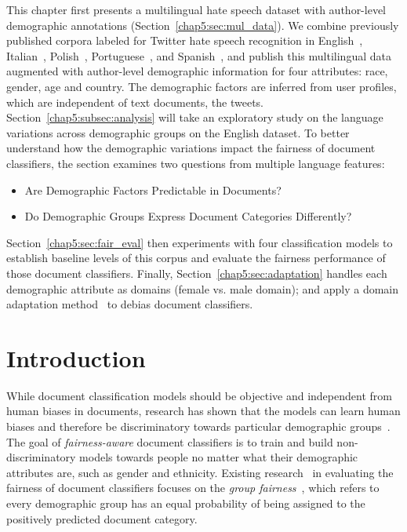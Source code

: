 This chapter first presents a multilingual hate speech dataset with author-level demographic annotations (Section~\ref{chap5:sec:mul_data}). 
We combine previously published corpora labeled for Twitter hate speech recognition in English~\cite{waseem2016hateful,waseem2016you,founta2018large}, Italian~\cite{sanguinetti2018italian}, Polish~\cite{ptaszynski2017learning}, Portuguese~\cite{fortuna2019hierarchically}, and Spanish~\cite{basile2019semeval}, and publish this multilingual data augmented with author-level demographic information for four attributes: race, gender, age and country.
The demographic factors are inferred from user profiles, which are independent of text documents, the tweets.
Section~\ref{chap5:subsec:analysis} will take an exploratory study on the language variations across demographic groups on the English dataset.
To better understand how the demographic variations impact the fairness of document classifiers, the section examines two questions from multiple language features:
\begin{itemize}
    \item Are Demographic Factors Predictable in Documents?
    \item Do Demographic Groups Express Document Categories Differently?
\end{itemize}
Section~\ref{chap5:sec:fair_eval} then experiments with four classification models to establish baseline levels of this corpus and evaluate the fairness performance of those document classifiers.
Finally, Section~\ref{chap5:sec:adaptation} handles each demographic attribute as domains (female vs. male domain); and apply a domain adaptation method~\cite{daume2007frustratingly} to debias document classifiers.



\section{Introduction}

While document classification models should be objective and independent from human biases in documents, research has shown that the models can learn human biases and therefore be discriminatory towards particular demographic groups~\cite{dixon2018measuring, borkan2019nuanced, sun2019mitigating}.
The goal of \textit{fairness-aware} document classifiers is to train and build non-discriminatory models towards people no matter what their demographic attributes are, such as gender and ethnicity.
Existing research~\cite{dixon2018measuring, kiritchenko2018examining, park2018reducing, garg2019counterfactual, borkan2019nuanced} in evaluating the fairness of document classifiers focuses on the \textit{group fairness}~\cite{chouldechova2018frontiers}, which refers to every demographic group has an equal probability of being assigned to the positively predicted document category.

